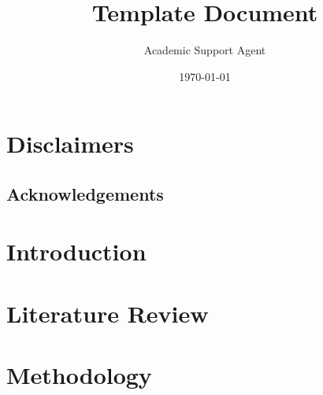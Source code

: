 \documentclass{article}
\title{Template Document}
\author{Academic Support Agent}
\date{\today}
\begin{document}
\maketitle



\section*{Disclaimers}

\pagebreak


\pagebreak

\begin{center}
\section*{Acknowledgements}
\end{center}


\pagebreak


\pagebreak


\pagebreak


\pagebreak


\section{Introduction}

\pagebreak

\section{Literature Review}

\pagebreak

\section{Methodology}
\end{document}
